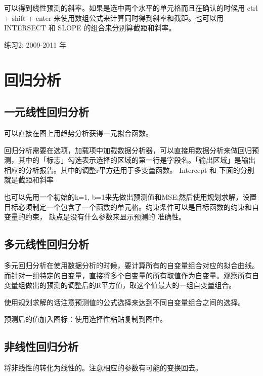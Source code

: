 \documentclass[10pt, a4paper]{article}
\begin{document}
        可以得到线性预测的斜率。如果是选中两个水平的单元格而且在确认的时候用 ctrl + shift + enter 来使用数组公式来计算同时得到斜率和截距。也可以用 INTERSECT 和 SLOPE 的组合来分别算截距和斜率。 
        
        练习2: 2009-2011 年

\section{回归分析}
    \subsection{一元线性回归分析}
        可以直接在图上用趋势分析获得一元拟合函数。
        
        回归分析需要在选项，加载项中加载数据分析器，可以直接用数据分析来做回归预测，其中的「标志」勾选表示选择的区域的第一行是字段名。「输出区域」是输出相应的分析报告。其中的调整r平方适用于多变量函数。 Intercept 和 下面的分别就是截距和斜率
        
        也可以先用一个初始的k=1, b=1来先做出预测值和MSE;然后使用规划求解，设置目标必须制定一个包含了一个函数的单元格。约束条件可以是目标函数的约束和自变量的约束， 缺点是没有什么参数来显示预测的 准确性。

    \subsection{多元线性回归分析}
        多元回归分析在使用数据分析的时候，要计算所有的自变量组合对应的拟合曲线。而针对一组特定的自变量，直接将多个自变量的所有取值作为自变量。观察所有自变量组做出的预测的调整后的R平方值，取这个值最大的一组自变量组合。

        使用规划求解的话注意预测值的公式选择来达到不同自变量组合之间的选择。

        预测后的值加入图标：使用选择性粘贴复制到图中。
    \subsection{非线性回归分析}
        将非线性的转化为线性的。注意相应的参数有可能的变换回去。
\end{document}
